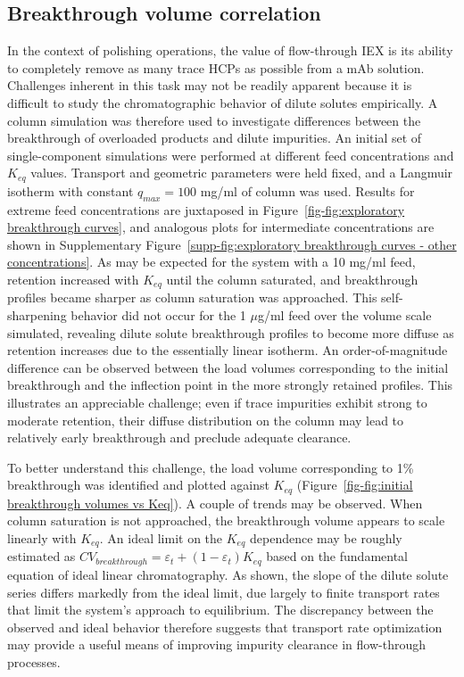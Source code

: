 \documentclass[preprint,review,12pt]{elsarticle}
\begin{document}
    \subsection{Breakthrough volume correlation} \label{ssec:break vol corr}
        In the context of polishing operations, the value of flow-through IEX is its ability to completely remove as many trace HCPs as possible from a mAb solution. Challenges inherent in this task may not be readily apparent because it is difficult to study the chromatographic behavior of dilute solutes empirically. A column simulation was therefore used to investigate differences between the breakthrough of overloaded products and dilute impurities. An initial set of single-component simulations were performed at different feed concentrations and $K_{eq}$ values. Transport and geometric parameters were held fixed, and a Langmuir isotherm with constant $q_{max} = 100$ mg/ml of column was used. Results for extreme feed concentrations are juxtaposed in Figure~\ref{fig-fig:exploratory breakthrough curves}, and analogous plots for intermediate concentrations are shown in Supplementary Figure~\ref{supp-fig:exploratory breakthrough curves - other concentrations}. As may be expected for the system with a 10 mg/ml feed, retention increased with $K_{eq}$ until the column saturated, and breakthrough profiles became sharper as column saturation was approached. This self-sharpening behavior did not occur for the 1 $\mu$g/ml feed over the volume scale simulated, revealing dilute solute breakthrough profiles to become more diffuse as retention increases due to the essentially linear isotherm. An order-of-magnitude difference can be observed between the load volumes corresponding to the initial breakthrough and the inflection point in the more strongly retained profiles. This illustrates an appreciable challenge; even if trace impurities exhibit strong to moderate retention, their diffuse distribution on the column may lead to relatively early breakthrough and preclude adequate clearance.


        
        To better understand this challenge, the load volume corresponding to 1\% breakthrough was identified and plotted against $K_{eq}$ (Figure~\ref{fig-fig:initial breakthrough volumes vs Keq}). A couple of trends may be observed. When column saturation is not approached, the breakthrough volume appears to scale linearly with $K_{eq}$. An ideal limit on the $K_{eq}$ dependence may be roughly estimated as $CV_{breakthrough} = \varepsilon_t + (1 - \varepsilon_t) K_{eq}$ based on the fundamental equation of ideal linear chromatography. As shown, the slope of the dilute solute series differs markedly from the ideal limit, due largely to finite transport rates that limit the system's approach to equilibrium. The discrepancy between the observed and ideal behavior therefore suggests that transport rate optimization may provide a useful means of improving impurity clearance in flow-through processes.
\end{document}
